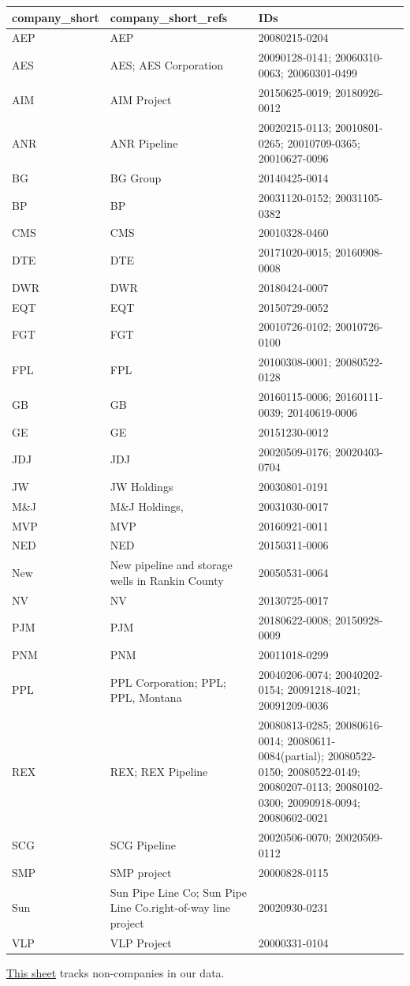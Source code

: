 \documentclass[]{article}
\newenvironment{Shaded}{\begin{snugshade}}{\end{snugshade}}
\newcommand{\CommentTok}[1]{\textcolor[rgb]{0.56,0.35,0.01}{\textit{#1}}}
\begin{document}
\begin{longtable}[]{@{}lll@{}}
\toprule
company\_short & company\_short\_refs & IDs\tabularnewline
\midrule
\endhead
AEP & AEP & 20080215-0204\tabularnewline
AES & AES; AES Corporation & 20090128-0141; 20060310-0063;
20060301-0499\tabularnewline
AIM & AIM Project & 20150625-0019; 20180926-0012\tabularnewline
ANR & ANR Pipeline & 20020215-0113; 20010801-0265; 20010709-0365;
20010627-0096\tabularnewline
BG & BG Group & 20140425-0014\tabularnewline
BP & BP & 20031120-0152; 20031105-0382\tabularnewline
CMS & CMS & 20010328-0460\tabularnewline
DTE & DTE & 20171020-0015; 20160908-0008\tabularnewline
DWR & DWR & 20180424-0007\tabularnewline
EQT & EQT & 20150729-0052\tabularnewline
FGT & FGT & 20010726-0102; 20010726-0100\tabularnewline
FPL & FPL & 20100308-0001; 20080522-0128\tabularnewline
GB & GB & 20160115-0006; 20160111-0039; 20140619-0006\tabularnewline
GE & GE & 20151230-0012\tabularnewline
JDJ & JDJ & 20020509-0176; 20020403-0704\tabularnewline
JW & JW Holdings & 20030801-0191\tabularnewline
M\&J & M\&J Holdings, & 20031030-0017\tabularnewline
MVP & MVP & 20160921-0011\tabularnewline
NED & NED & 20150311-0006\tabularnewline
New & New pipeline and storage wells in Rankin County &
20050531-0064\tabularnewline
NV & NV & 20130725-0017\tabularnewline
PJM & PJM & 20180622-0008; 20150928-0009\tabularnewline
PNM & PNM & 20011018-0299\tabularnewline
PPL & PPL Corporation; PPL; PPL, Montana & 20040206-0074; 20040202-0154;
20091218-4021; 20091209-0036\tabularnewline
REX & REX; REX Pipeline & 20080813-0285; 20080616-0014;
20080611-0084(partial); 20080522-0150; 20080522-0149; 20080207-0113;
20080102-0300; 20090918-0094; 20080602-0021\tabularnewline
SCG & SCG Pipeline & 20020506-0070; 20020509-0112\tabularnewline
SMP & SMP project & 20000828-0115\tabularnewline
Sun & Sun Pipe Line Co; Sun Pipe Line Co.right-of-way line project &
20020930-0231\tabularnewline
VLP & VLP Project & 20000331-0104\tabularnewline
\bottomrule
\end{longtable}

\begin{Shaded}
\end{Shaded}

\href{https://docs.google.com/spreadsheets/d/1-QNgeiMnH97jN_0vCqFKEGEB5Ztpito3iRsqK8jN3Cs/edit\#gid=0}{This
sheet} tracks non-companies in our data.
\end{document}
